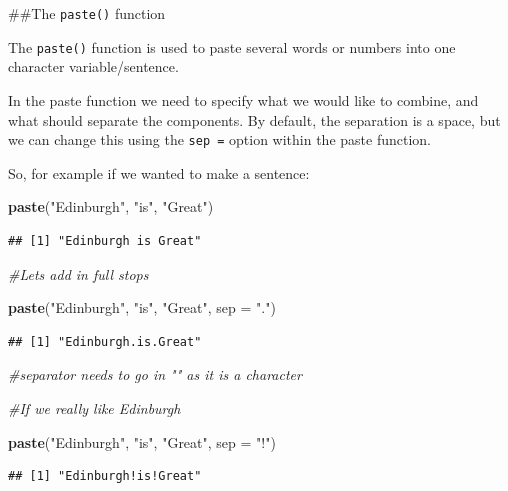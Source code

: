 \documentclass[]{book}
\makeatletter
\newenvironment{Shaded}{\begin{snugshade}}{\end{snugshade}}
\newcommand{\CommentTok}[1]{\textcolor[rgb]{0.56,0.35,0.01}{\textit{#1}}}
\newcommand{\DataTypeTok}[1]{\textcolor[rgb]{0.13,0.29,0.53}{#1}}
\newcommand{\KeywordTok}[1]{\textcolor[rgb]{0.13,0.29,0.53}{\textbf{#1}}}
\newcommand{\NormalTok}[1]{#1}
\newcommand{\StringTok}[1]{\textcolor[rgb]{0.31,0.60,0.02}{#1}}
\newenvironment{kframe}{%
\medskip{}
\setlength{\fboxsep}{.8em}
 \def\at@end@of@kframe{}%
 \ifinner\ifhmode%
  \def\at@end@of@kframe{\end{minipage}}%
  \begin{minipage}{\columnwidth}%
 \fi\fi%
 \def\FrameCommand##1{\hskip\@totalleftmargin \hskip-\fboxsep
 \colorbox{shadecolor}{##1}\hskip-\fboxsep
     \hskip-\linewidth \hskip-\@totalleftmargin \hskip\columnwidth}%
 \MakeFramed {\advance\hsize-\width
   \@totalleftmargin\z@ \linewidth\hsize
   \@setminipage}}%
 {\par\unskip\endMakeFramed%
 \at@end@of@kframe}
\renewenvironment{Shaded}{\begin{kframe}}{\end{kframe}}
\theoremstyle{definition}
\theoremstyle{definition}
\theoremstyle{definition}
\theoremstyle{remark}
\makeatother
\begin{document}
\newpage

\#\#The \texttt{paste()} function

The \texttt{paste()} function is used to paste several words or numbers
into one character variable/sentence.

In the paste function we need to specify what we would like to combine,
and what should separate the components. By default, the separation is a
space, but we can change this using the \texttt{sep\ =} option within
the paste function.

So, for example if we wanted to make a sentence:

\begin{Shaded}
\begin{Highlighting}[]
\KeywordTok{paste}\NormalTok{(}\StringTok{"Edinburgh"}\NormalTok{, }\StringTok{"is"}\NormalTok{, }\StringTok{"Great"}\NormalTok{)}
\end{Highlighting}
\end{Shaded}

\begin{verbatim}
## [1] "Edinburgh is Great"
\end{verbatim}

\begin{Shaded}
\begin{Highlighting}[]
\CommentTok{#Lets add in full stops}

\KeywordTok{paste}\NormalTok{(}\StringTok{"Edinburgh"}\NormalTok{, }\StringTok{"is"}\NormalTok{, }\StringTok{"Great"}\NormalTok{, }\DataTypeTok{sep =} \StringTok{"."}\NormalTok{)}
\end{Highlighting}
\end{Shaded}

\begin{verbatim}
## [1] "Edinburgh.is.Great"
\end{verbatim}

\begin{Shaded}
\begin{Highlighting}[]
\CommentTok{#separator needs to go in "" as it is a character}

\CommentTok{#If we really like Edinburgh}

\KeywordTok{paste}\NormalTok{(}\StringTok{"Edinburgh"}\NormalTok{, }\StringTok{"is"}\NormalTok{, }\StringTok{"Great"}\NormalTok{, }\DataTypeTok{sep =} \StringTok{"!"}\NormalTok{)}
\end{Highlighting}
\end{Shaded}

\begin{verbatim}
## [1] "Edinburgh!is!Great"
\end{verbatim}
\end{document}
